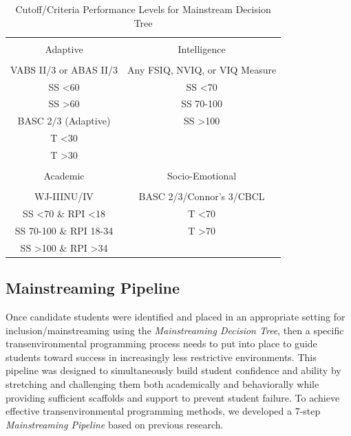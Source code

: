 \documentclass[twoside]{article}
\begin{document}
%
\begin{table}[tbp]
\centering
\caption{Cutoff/Criteria Performance Levels for Mainstream Decision Tree}
\label{tab3}
\begin{tabular}{cc}
\hline \\
Adaptive & Intelligence\\
\hline \\
VABS II/3 or ABAS II/3 & Any FSIQ, NVIQ, or VIQ Measure\\
SS \textless60 & SS \textless70\\
SS \textgreater60 & SS 70-100\\
BASC 2/3 (Adaptive) & SS \textgreater100\\
T \textless30 & \\
T \textgreater30 & \\
\hline \\
Academic & Socio-Emotional\\
\hline \\
WJ-IIINU/IV & BASC 2/3/Connor's 3/CBCL\\
SS \textless70 \& RPI \textless18 & T \textless70\\
SS 70-100 \& RPI 18-34 & T \textgreater70\\
SS \textgreater100 \& RPI \textgreater34 &\\
\hline
\end{tabular}
\end{table}
%
%
%
%
%
%
%
%
\subsection{Mainstreaming Pipeline}
Once candidate students were identified and placed in an appropriate setting for inclusion/mainstreaming using the \textit{Mainstreaming Decision Tree}, then a specific transenvironmental programming process needs to put into place to guide students toward success in increasingly less restrictive environments. This pipeline was designed to simultaneously build student confidence and ability by stretching and challenging them both academically and behaviorally while providing sufficient scaffolds and support to prevent student failure. To achieve effective transenvironmental programming methods, we developed a 7-step \textit{Mainstreaming Pipeline} based on previous research\parencite{fuchs1993conservative,fuchs1994classroom,marden2013criteria,mathes1998preparing,wadsworth1999preparing,wadsworth1999preparing}. 
\end{document}
